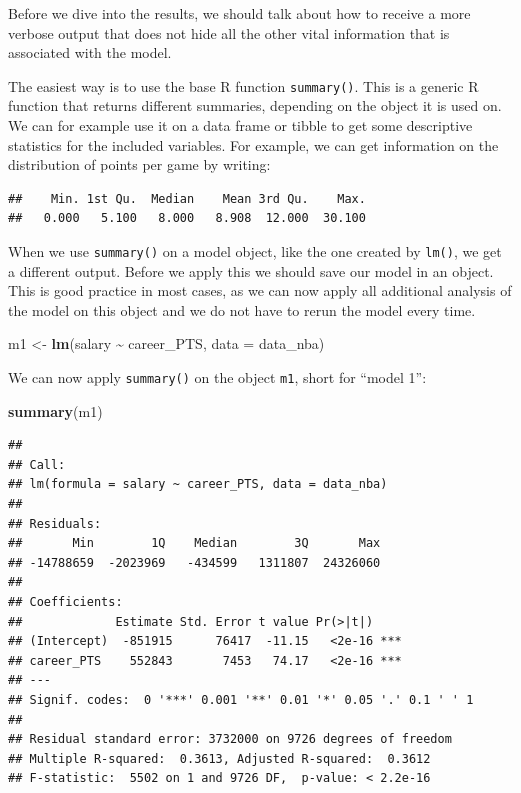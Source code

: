 \documentclass[
]{book}
\newenvironment{Shaded}{\begin{snugshade}}{\end{snugshade}}
\newcommand{\AttributeTok}[1]{\textcolor[rgb]{0.13,0.29,0.53}{#1}}
\newcommand{\FunctionTok}[1]{\textcolor[rgb]{0.13,0.29,0.53}{\textbf{#1}}}
\newcommand{\NormalTok}[1]{#1}
\newcommand{\OtherTok}[1]{\textcolor[rgb]{0.56,0.35,0.01}{#1}}
\newcommand{\SpecialCharTok}[1]{\textcolor[rgb]{0.81,0.36,0.00}{\textbf{#1}}}
\begin{document}
Before we dive into the results, we should talk about how to receive a more
verbose output that does not hide all the other vital information that is
associated with the model.

The easiest way is to use the base R function \texttt{summary()}. This is a generic R
function that returns different summaries, depending on the object it is used
on. We can for example use it on a data frame or tibble to get some descriptive
statistics for the included variables. For example, we can get information on the
distribution of points per game by writing:

\begin{Shaded}
\end{Shaded}

\begin{verbatim}
##    Min. 1st Qu.  Median    Mean 3rd Qu.    Max. 
##   0.000   5.100   8.000   8.908  12.000  30.100
\end{verbatim}

When we use \texttt{summary()} on a model object, like the one created by \texttt{lm()}, we
get a different output. Before we apply this we should save our model in an
object. This is good practice in most cases, as we can now apply all additional
analysis of the model on this object and we do not have to rerun the model
every time.

\begin{Shaded}
\begin{Highlighting}[]
\NormalTok{m1 }\OtherTok{\textless{}{-}} \FunctionTok{lm}\NormalTok{(salary }\SpecialCharTok{\textasciitilde{}}\NormalTok{ career\_PTS, }\AttributeTok{data =}\NormalTok{ data\_nba)}
\end{Highlighting}
\end{Shaded}

We can now apply \texttt{summary()} on the object \texttt{m1}, short for ``model 1'':

\begin{Shaded}
\begin{Highlighting}[]
\FunctionTok{summary}\NormalTok{(m1)}
\end{Highlighting}
\end{Shaded}

\begin{verbatim}
## 
## Call:
## lm(formula = salary ~ career_PTS, data = data_nba)
## 
## Residuals:
##       Min        1Q    Median        3Q       Max 
## -14788659  -2023969   -434599   1311807  24326060 
## 
## Coefficients:
##             Estimate Std. Error t value Pr(>|t|)    
## (Intercept)  -851915      76417  -11.15   <2e-16 ***
## career_PTS    552843       7453   74.17   <2e-16 ***
## ---
## Signif. codes:  0 '***' 0.001 '**' 0.01 '*' 0.05 '.' 0.1 ' ' 1
## 
## Residual standard error: 3732000 on 9726 degrees of freedom
## Multiple R-squared:  0.3613, Adjusted R-squared:  0.3612 
## F-statistic:  5502 on 1 and 9726 DF,  p-value: < 2.2e-16
\end{verbatim}
\end{document}
